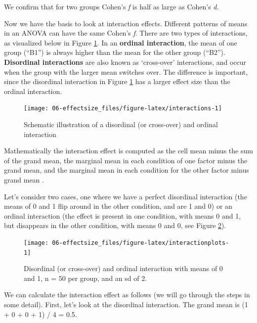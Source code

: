 \documentclass[
  oneside]{book}
\begin{document}
We confirm that for two groups Cohen's \emph{f} is half as large as Cohen's \emph{d}.

Now we have the basis to look at interaction effects. Different patterns of means in an ANOVA can have the same Cohen's \emph{f}. There are two types of interactions, as visualized below in Figure \ref{fig:interactions}. In an \textbf{ordinal interaction}, the mean of one group (``B1'') is always higher than the mean for the other group (``B2''). \textbf{Disordinal interactions} are also known as `cross-over' interactions, and occur when the group with the larger mean switches over. The difference is important, since the disordinal interaction in Figure \ref{fig:interactions} has a larger effect size than the ordinal interaction.

\begin{figure}

{\centering \texttt{[image: 06-effectsize\_files/figure-latex/interactions-1]} 

}

\caption{Schematic illustration of a disordinal (or cross-over) and ordinal interaction}\label{fig:interactions}
\end{figure}

Mathematically the interaction effect is computed as the cell mean minus the sum of the grand mean, the marginal mean in each condition of one factor minus the grand mean, and the marginal mean in each condition for the other factor minus grand mean \citep{maxwell_designing_2004}.

Let's consider two cases, one where we have a perfect disordinal interaction (the means of 0 and 1 flip around in the other condition, and are 1 and 0) or an ordinal interaction (the effect is present in one condition, with means 0 and 1, but disappears in the other condition, with means 0 and 0, see Figure \ref{fig:interactionplots}).

\begin{figure}

{\centering \texttt{[image: 06-effectsize\_files/figure-latex/interactionplots-1]} 

}

\caption{Disordinal (or cross-over) and ordinal interaction with means of 0 and 1, n = 50 per group, and an sd of 2.}\label{fig:interactionplots}
\end{figure}

We can calculate the interaction effect as follows (we will go through the steps in some detail). First, let's look at the disordinal interaction. The grand mean is (1 + 0 + 0 + 1) / 4 = 0.5.
\end{document}
